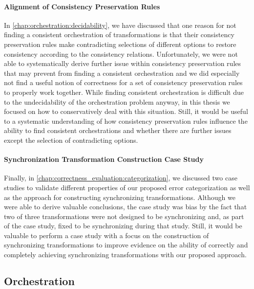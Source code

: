\paragraph{Alignment of Consistency Preservation Rules}
\label{chap:futurework:correctness:synchronization:cpr_alignment}
In \autoref{chap:orchestration:decidability}, we have discussed that one reason for not finding a consistent orchestration of transformations is that their consistency preservation rules make contradicting selections of different options to restore consistency according to the consistency relations.
Unfortunately, we were not able to systematically derive further issue within consistency preservation rules that may prevent from finding a consistent orchestration and we did especially not find a useful notion of correctness for a set of consistency preservation rules to properly work together.
While finding consistent orchestration is difficult due to the undecidability of the orchestration problem anyway, in this thesis we focused on how to conservatively deal with this situation.
Still, it would be useful to a systematic understanding of how consistency preservation rules influence the ability to find consistent orchestrations and whether there are further issues except the selection of contradicting options.


\paragraph{Synchronization Transformation Construction Case Study}
\label{chap:futurework:correctness:synchronization:case_study}
Finally, in \autoref{chap:correctness_evaluation:categorization}, we discussed two case studies to validate different properties of our proposed error categorization as well as the approach for constructing synchronizing transformations.
Although we were able to derive valuable conclusions, the case study was bias by the fact that two of three transformations were not designed to be synchronizing and, as part of the case study, fixed to be synchronizing during that study.
Still, it would be valuable to perform a case study with a focus on the construction of synchronizing transformations to improve evidence on the ability of correctly and completely achieving synchronizing transformations with our proposed approach.


\subsection{Orchestration}

